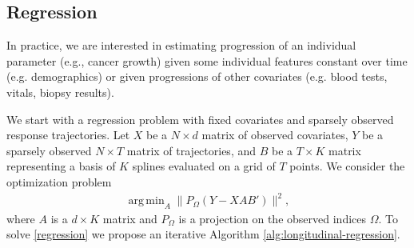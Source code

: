 \documentclass[preprint]{imsart}
\numberwithin{equation}{section}
\theoremstyle{plain}
\DeclareMathOperator*{\argmin}{arg\,min}
\begin{document}

\subsection{Regression}\label{ss:regression}

In practice, we are interested in estimating progression of an individual parameter (e.g., cancer growth) given some individual features constant over time (e.g. demographics) or given progressions of other covariates (e.g. blood tests, vitals, biopsy results).

We start with a regression problem with fixed covariates and sparsely observed response trajectories. Let $X$ be a $N \times d$ matrix of observed covariates, $Y$ be a sparsely observed $N \times T$ matrix of trajectories, and $B$ be a $T \times K$ matrix representing a basis of $K$ splines evaluated on a grid of $T$ points. We consider the optimization problem
\begin{align}\label{regression}
 \argmin_A \| P_\Omega(Y - XAB')\|^2,
\end{align}
where $A$ is a $d \times K$ matrix and $P_\Omega$ is a projection on the observed indices $\Omega$. To solve \eqref{regression} we propose an iterative Algorithm \ref{alg:longitudinal-regression}.
\end{document}
